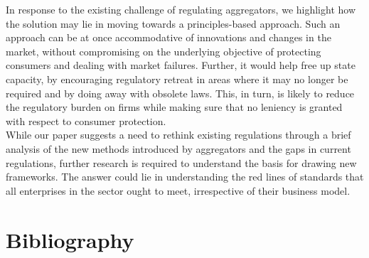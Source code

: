 \documentclass[a4paper, 12pt, twoside]{article}
\begin{document}
In response to the existing challenge of regulating aggregators, we highlight how the solution may lie in moving towards a principles-based approach. Such an approach can be at once accommodative of innovations and changes in the market, without compromising on the underlying objective of protecting consumers and dealing with market failures. Further, it would help free up state capacity, by encouraging regulatory retreat in areas where it may no longer be required and by doing away with obsolete laws. This, in turn, is likely to reduce the regulatory burden on firms while making sure that no leniency is granted with respect to consumer protection. \\

While our paper suggests a need to rethink existing regulations through a brief analysis of the new methods introduced by aggregators and the gaps in current regulations, further research is required to understand the basis for drawing new frameworks. The answer could lie in understanding the red lines of standards that all enterprises in the sector ought to meet, irrespective of their business model.

               
         

\section*{Bibliography}
\printbibliography[heading=none] 	

	\newpage

\end{document}
